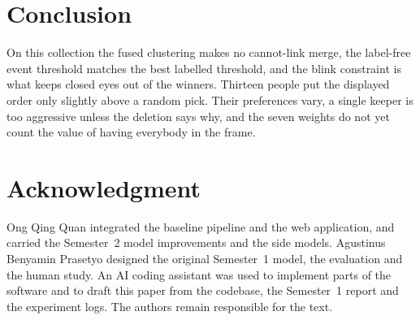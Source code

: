\documentclass[conference]{IEEEtran}
\begin{document}
\section{Conclusion}

On this collection the fused clustering makes no cannot-link merge, the
label-free event threshold matches the best labelled threshold, and the blink
constraint is what keeps closed eyes out of the winners. Thirteen people put the
displayed order only slightly above a random pick. Their preferences vary, a
single keeper is too aggressive unless the deletion says why, and the seven
weights do not yet count the value of having everybody in the frame.

\section*{Acknowledgment}
Ong Qing Quan integrated the baseline pipeline and the web application, and
carried the Semester~2 model improvements and the side models. Agustinus
Benyamin Prasetyo designed the original Semester~1 model, the evaluation and
the human study. An AI coding assistant was used to implement parts of the
software and to draft this paper from the codebase, the Semester~1 report and
the experiment logs. The authors remain responsible for the text.
\end{document}
